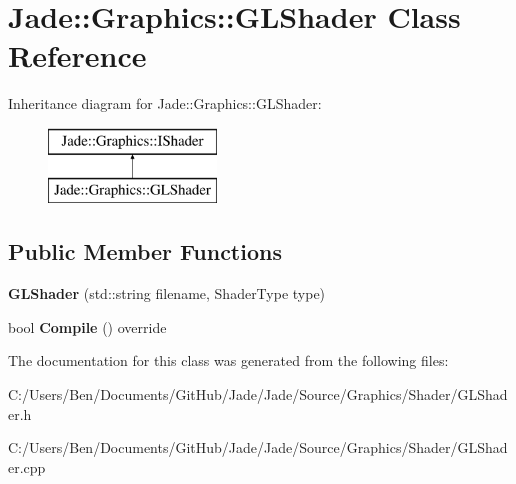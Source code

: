 \hypertarget{class_jade_1_1_graphics_1_1_g_l_shader}{}\section{Jade\+:\+:Graphics\+:\+:G\+L\+Shader Class Reference}
\label{class_jade_1_1_graphics_1_1_g_l_shader}
Inheritance diagram for Jade\+:\+:Graphics\+:\+:G\+L\+Shader\+:\begin{figure}[H]
\begin{center}
\leavevmode
\includegraphics[height=2.000000cm]{class_jade_1_1_graphics_1_1_g_l_shader}
\end{center}
\end{figure}
\subsection*{Public Member Functions}
\begin{DoxyCompactItemize}
\item 
\hypertarget{class_jade_1_1_graphics_1_1_g_l_shader_a5428ee0d0ff44a8d18139ca7d9f86ce6}{}{\bfseries G\+L\+Shader} (std\+::string filename, Shader\+Type type)\label{class_jade_1_1_graphics_1_1_g_l_shader_a5428ee0d0ff44a8d18139ca7d9f86ce6}

\item 
\hypertarget{class_jade_1_1_graphics_1_1_g_l_shader_aa6d54ae78440642e692de0dad54f5940}{}bool {\bfseries Compile} () override\label{class_jade_1_1_graphics_1_1_g_l_shader_aa6d54ae78440642e692de0dad54f5940}

\end{DoxyCompactItemize}


The documentation for this class was generated from the following files\+:\begin{DoxyCompactItemize}
\item 
C\+:/\+Users/\+Ben/\+Documents/\+Git\+Hub/\+Jade/\+Jade/\+Source/\+Graphics/\+Shader/G\+L\+Shader.\+h\item 
C\+:/\+Users/\+Ben/\+Documents/\+Git\+Hub/\+Jade/\+Jade/\+Source/\+Graphics/\+Shader/G\+L\+Shader.\+cpp\end{DoxyCompactItemize}
